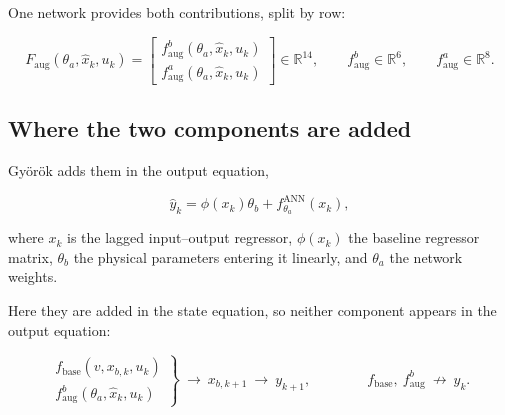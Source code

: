 \documentclass[12pt]{article}
\newcommand{\R}{\mathbb{R}}
\newcommand{\fbase}{f_{\mathrm{base}}}
\newcommand{\faug}{f_{\mathrm{aug}}}
\newcommand{\Faug}{F_{\mathrm{aug}}}
\newcommand{\ANN}{\mathrm{ANN}}
\newcommand{\panel}[1]{\subsection*{\Large #1}\vspace{1mm}}
\begin{document}
One network provides both contributions, split by row:

\begin{equation*}
\Faug(\theta_a,\widehat x_k,u_k)
=\begin{bmatrix}
\faug^{b}(\theta_a,\widehat x_k,u_k)\\[1.5mm]
\faug^{a}(\theta_a,\widehat x_k,u_k)
\end{bmatrix}\in\R^{14},
\qquad
\faug^{b}\in\R^{6},
\qquad
\faug^{a}\in\R^{8}.
\end{equation*}

\newpage
\panel{Where the two components are added}

Gy\"or\"ok adds them in the output equation,

\begin{equation*}
\widehat y_k=\phi(x_k)\theta_b+f^{\ANN}_{\theta_a}(x_k),
\tag{Eq.~3}
\end{equation*}

where $x_k$ is the lagged input--output regressor, $\phi(x_k)$ the baseline
regressor matrix, $\theta_b$ the physical parameters entering it linearly, and
$\theta_a$ the network weights.

\vspace{2mm}
Here they are added in the state equation, so neither component appears in the
output equation:

\begin{equation*}
\left.
\begin{array}{r}
\fbase(v,x_{b,k},u_k)\\[1.5mm]
\faug^{b}(\theta_a,\widehat x_k,u_k)
\end{array}
\right\}
\ \longrightarrow\ x_{b,k+1}
\ \longrightarrow\ y_{k+1},
\qquad\qquad
\fbase,\ \faug^{b}\ \nrightarrow\ y_k .
\end{equation*}
\end{document}
